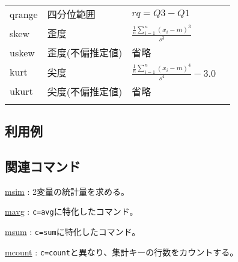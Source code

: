 \begin{table}[htbp]
{\begin{tabular}{llll}
qrange & 四分位範囲       & $rq=Q3-Q1$ & \\
skew   & 歪度             & $\frac{\frac{1}{n}\sum_{i=1}^n (x_i-m)^3}{s^3}$ & \\
uskew  & 歪度(不偏推定値) & 省略 & \\
kurt   & 尖度             & $\frac{\frac{1}{n}\sum_{i=1}^n (x_i-m)^4}{s^4}-3.0$ & \\
ukurt  & 尖度(不偏推定値) & 省略 & \\
\hline \\
\end{tabular}
}
\end{table}

\subsection*{利用例}

\subsection*{関連コマンド}
\hyperref[sect:msim]{msim} : 2変量の統計量を求める。

\hyperref[sect:mavg] {mavg} : \verb|c=avg|に特化したコマンド。

\hyperref[sect:msum] {msum} : \verb|c=sum|に特化したコマンド。

\hyperref[sect:mcount] {mcount} : \verb|c=count|と異なり、集計キーの行数をカウントする。

%
